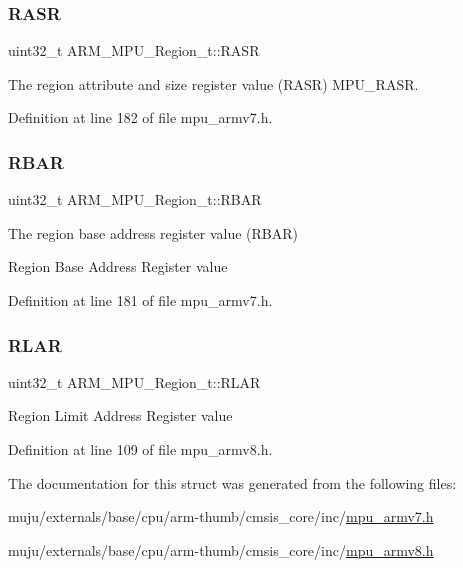 \subsubsection{\texorpdfstring{R\+A\+SR}{RASR}}
{\footnotesize\ttfamily uint32\+\_\+t A\+R\+M\+\_\+\+M\+P\+U\+\_\+\+Region\+\_\+t\+::\+R\+A\+SR}



The region attribute and size register value (R\+A\+SR) M\+P\+U\+\_\+\+R\+A\+SR. 



Definition at line 182 of file mpu\+\_\+armv7.\+h.

\mbox{\label{struct_a_r_m___m_p_u___region__t_afe7a7721aa08988d915670efa432cdd2}} 
\subsubsection{\texorpdfstring{R\+B\+AR}{RBAR}}
{\footnotesize\ttfamily uint32\+\_\+t A\+R\+M\+\_\+\+M\+P\+U\+\_\+\+Region\+\_\+t\+::\+R\+B\+AR}



The region base address register value (R\+B\+AR) 

Region Base Address Register value 

Definition at line 181 of file mpu\+\_\+armv7.\+h.

\mbox{\label{struct_a_r_m___m_p_u___region__t_ab5d3a650dbffd0b272bf7df5b140e8a8}} 
\subsubsection{\texorpdfstring{R\+L\+AR}{RLAR}}
{\footnotesize\ttfamily uint32\+\_\+t A\+R\+M\+\_\+\+M\+P\+U\+\_\+\+Region\+\_\+t\+::\+R\+L\+AR}

Region Limit Address Register value 

Definition at line 109 of file mpu\+\_\+armv8.\+h.



The documentation for this struct was generated from the following files\+:\begin{DoxyCompactItemize}
\item 
muju/externals/base/cpu/arm-\/thumb/cmsis\+\_\+core/inc/\hyperlink{mpu__armv7_8h}{mpu\+\_\+armv7.\+h}\item 
muju/externals/base/cpu/arm-\/thumb/cmsis\+\_\+core/inc/\hyperlink{mpu__armv8_8h}{mpu\+\_\+armv8.\+h}\end{DoxyCompactItemize}
